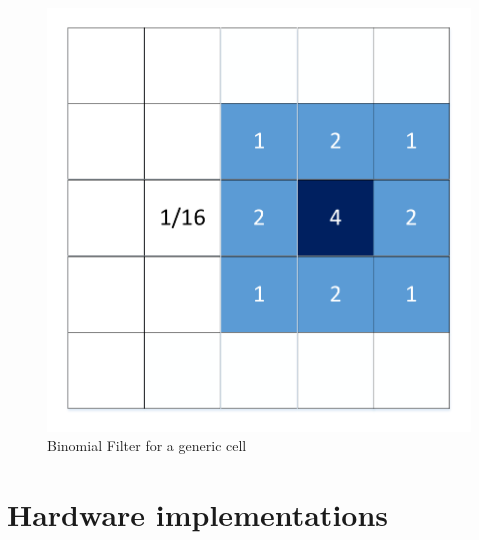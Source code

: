         \begin{figure}[h!]
        	\centering
        	\includegraphics[width=\textwidth]{imm/bf/bf1.pdf} 	\caption{Binomial Filter for a generic cell} 
        	\label{fig:bf1}
        \end{figure}
        \clearpage
        \section{Hardware implementations} \label{bfh}
